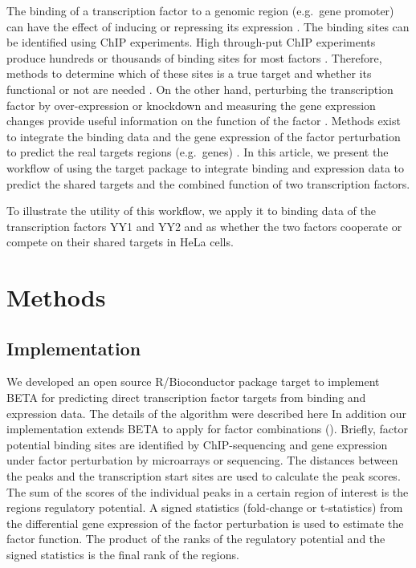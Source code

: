 \documentclass[9pt,a4paper,]{extarticle}
\begin{document}
The binding of a transcription factor to a genomic region (e.g.~gene promoter) can have the effect of inducing or repressing its expression \citet{Latchman2001}. The binding sites can be identified using ChIP experiments. High through-put ChIP experiments produce hundreds or thousands of binding sites for most factors \citet{Johnson2007a}. Therefore, methods to determine which of these sites is a true target and whether its functional or not are needed \citet{Ucar2009}. On the other hand, perturbing the transcription factor by over-expression or knockdown and measuring the gene expression changes provide useful information on the function of the factor \citet{Tran2005}. Methods exist to integrate the binding data and the gene expression of the factor perturbation to predict the real targets regions (e.g.~genes) \citep{Subramanian2005, Wang2013b}. In this article, we present the workflow of using the target package to integrate binding and expression data to predict the shared targets and the combined function of two transcription factors.

To illustrate the utility of this workflow, we apply it to binding data of the transcription factors YY1 and YY2 and as whether the two factors cooperate or compete on their shared targets in HeLa cells.

\hypertarget{methods}{%
\section{Methods}\label{methods}}

\hypertarget{implementation}{%
\subsection{Implementation}\label{implementation}}

We developed an open source R/Bioconductor package target to implement BETA for predicting direct transcription factor targets from binding and expression data. The details of the algorithm were described here \citet{Wang2013b} In addition our implementation extends BETA to apply for factor combinations (\citet{Ahmed2020}). Briefly, factor potential binding sites are identified by ChIP-sequencing and gene expression under factor perturbation by microarrays or sequencing. The distances between the peaks and the transcription start sites are used to calculate the peak scores. The sum of the scores of the individual peaks in a certain region of interest is the regions regulatory potential. A signed statistics (fold-change or t-statistics) from the differential gene expression of the factor perturbation is used to estimate the factor function. The product of the ranks of the regulatory potential and the signed statistics is the final rank of the regions.
\end{document}
